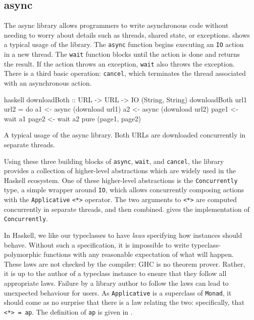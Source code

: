 \FloatBarrier

\subsection{async}
\label{sec:dejafu-casestudies-async}

The async library \parencite{async} allows programmers to write asynchronous
code without needing to worry about details such as threads, shared
state, or exceptions.   shows a typical usage
of the library.  The \verb|async| function begins executing an
\verb|IO| action in a new thread.  The \verb|wait| function blocks
until the action is done and returns the result.  If the action throws
an exception, \verb|wait| also throws the exception.  There is a third
basic operation: \verb|cancel|, which terminates the thread associated
with an asynchronous action.

\begin{listing}
\centering
\begin{cminted}{haskell}
downloadBoth :: URL -> URL -> IO (String, String)
downloadBoth url1 url2 = do
  a1 <- async (download url1)
  a2 <- async (download url2)
  page1 <- wait a1
  page2 <- wait a2
  pure (page1, page2)
\end{cminted}
\caption[A typical usage of the async library.]{A typical usage of the async library.  Both URLs are downloaded concurrently in separate threads.}\label{lst:async_example}
\end{listing}

Using these three building blocks of \verb|async|, \verb|wait|, and
\verb|cancel|, the library provides a collection of higher-level
abstractions which are widely used in the Haskell ecosystem.  One of
these higher-level abstractions is the \verb|Concurrently| type, a
simple wrapper around \verb|IO|, which allows concurrently composing
actions with the \verb|Applicative| \verb|<*>| operator.  The two
arguments to \verb|<*>| are computed concurrently in separate threads,
and then combined.   gives the implementation
of \verb|Concurrently|.

In Haskell, we like our typeclasses to have \emph{laws} specifying how
instances should behave.  Without such a specification, it is
impossible to write typeclass-polymorphic functions with any
reasonable expectation of what will happen.  These laws are not
checked by the compiler: GHC is no theorem prover.  Rather, it is up
to the author of a typeclass instance to ensure that they follow all
appropriate laws.  Failure by a library author to follow the laws can
lead to unexpected behaviour for users.  As \verb|Applicative| is a
superclass of \verb|Monad|, it should come as no surprise that there
is a law relating the two: specifically, that \verb|<*> = ap|.  The
definition of \verb|ap| is given in .

